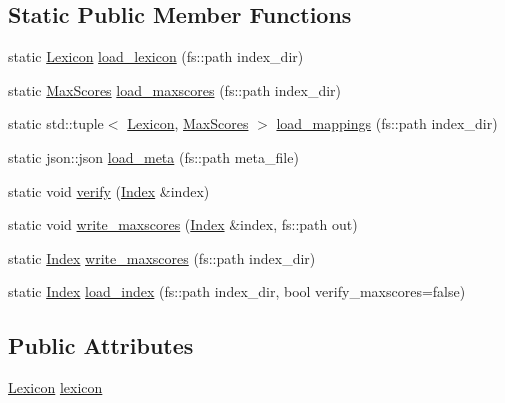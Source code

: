 \subsection*{Static Public Member Functions}
\begin{DoxyCompactItemize}
\item 
static \mbox{\hyperlink{namespacebloodhound_a94032a3533df0a1b6d3435bad57e6499}{Lexicon}} \mbox{\hyperlink{classbloodhound_1_1index_1_1Index_a80968041cad02a4006fd4b633c279030}{load\+\_\+lexicon}} (fs\+::path index\+\_\+dir)
\item 
static \mbox{\hyperlink{namespacebloodhound_a687d80c6f992eba8b820bf30a482f4b4}{Max\+Scores}} \mbox{\hyperlink{classbloodhound_1_1index_1_1Index_a6333778f622dbf964ba6aea29a56dca0}{load\+\_\+maxscores}} (fs\+::path index\+\_\+dir)
\item 
static std\+::tuple$<$ \mbox{\hyperlink{namespacebloodhound_a94032a3533df0a1b6d3435bad57e6499}{Lexicon}}, \mbox{\hyperlink{namespacebloodhound_a687d80c6f992eba8b820bf30a482f4b4}{Max\+Scores}} $>$ \mbox{\hyperlink{classbloodhound_1_1index_1_1Index_a779359e7ce40294dd3d3666c00762700}{load\+\_\+mappings}} (fs\+::path index\+\_\+dir)
\item 
static json\+::json \mbox{\hyperlink{classbloodhound_1_1index_1_1Index_af0d9b72f7cf6b54d7bddbccd3c1898ce}{load\+\_\+meta}} (fs\+::path meta\+\_\+file)
\item 
static void \mbox{\hyperlink{classbloodhound_1_1index_1_1Index_a6f1e18905c2b5babd30f33467c79018a}{verify}} (\mbox{\hyperlink{classbloodhound_1_1index_1_1Index}{Index}} \&index)
\item 
static void \mbox{\hyperlink{classbloodhound_1_1index_1_1Index_a02e947bdd77e51dcb09db5b7f03f14c7}{write\+\_\+maxscores}} (\mbox{\hyperlink{classbloodhound_1_1index_1_1Index}{Index}} \&index, fs\+::path out)
\item 
static \mbox{\hyperlink{classbloodhound_1_1index_1_1Index}{Index}} \mbox{\hyperlink{classbloodhound_1_1index_1_1Index_a46fcfc3c54ecf18d4ff58a240557b567}{write\+\_\+maxscores}} (fs\+::path index\+\_\+dir)
\item 
static \mbox{\hyperlink{classbloodhound_1_1index_1_1Index}{Index}} \mbox{\hyperlink{classbloodhound_1_1index_1_1Index_ad4cd13bef623fc6b786f8003c8826b9c}{load\+\_\+index}} (fs\+::path index\+\_\+dir, bool verify\+\_\+maxscores=false)
\end{DoxyCompactItemize}
\subsection*{Public Attributes}
\begin{DoxyCompactItemize}
\item 
\mbox{\hyperlink{namespacebloodhound_a94032a3533df0a1b6d3435bad57e6499}{Lexicon}} \mbox{\hyperlink{classbloodhound_1_1index_1_1Index_a746d80c2fb411f512726c8d37cad78fc}{lexicon}}
\end{DoxyCompactItemize}
